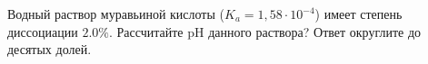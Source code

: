 
Водный
раствор муравьиной кислоты ($K_a = 1,58 \cdot 10^{-4}$) имеет степень
диссоциации $2.0\%$. Рассчитайте pH данного раствора? Ответ округлите до десятых долей.



